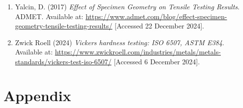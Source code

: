 \documentclass{article}
\begin{document}
{\begin{enumerate}
    \item Yalcin, D. (2017) \textit{Effect of Specimen Geometry on Tensile Testing Results}. ADMET. Available at: \url{https://www.admet.com/blog/effect-specimen-geometry-tensile-testing-results/} [Accessed 22 December 2024].
    
    \item Zwick Roell (2024) \textit{Vickers hardness testing: ISO 6507, ASTM E384}. Available at: \url{https://www.zwickroell.com/industries/metals/metals-standards/vickers-test-iso-6507/} [Accessed 6 December 2024].
\end{enumerate}


    
    
    

    \newpage\vspace*{-30pt}
    
   
    
\section{Appendix}
\normalsize
\renewcommand{\thesubsection}{\Alph{subsection}}

}
\end{document}
